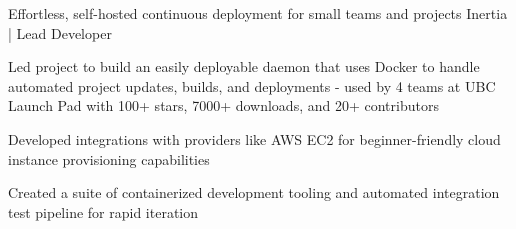  {\scshape{}}
\begin{cventries}

  \cventry
    {Effortless, self-hosted continuous deployment for small teams and projects} %
    {Inertia | Lead Developer} %
    {} %
    {} %
    {
      \begin{cvitems} %
        \item {Led project to build an easily deployable daemon that uses Docker to handle automated project updates, builds, and deployments - used by 4 teams at UBC Launch Pad with 100+ stars, 7000+ downloads, and 20+ contributors}
        \item {Developed integrations with providers like AWS EC2 for beginner-friendly cloud instance provisioning capabilities}
        \item{Created a suite of containerized development tooling and automated integration test pipeline for rapid iteration}
      \end{cvitems}
    }

\iffalse
  \cventry
    {Game scouting and performance analytics for League of Legends teams} %
    {Seer | Personal Project} %
    {\linktext{bobheadxi.dev/r/seer}} %
    {} %
    {
      \begin{cvitems} %
        \item {leveraged Google BigQuery as a data warehouse for team match history and queries for trends and aggregations}
        \item {built graph visualizations in Vue.js, Vuex, and ChartJS for displaying team trends and performance insights}
        \item {implemented a job-based framework for managing data to handle rate limits of dependencies and for error resilience}
      \end{cvitems}
    }
\fi
\iffalse
  \cventry
    {Continuous benchmarking and benchmark visualization} %
    {Gobenchdata | Personal Project} %
    {\linktext{bobheadxi.dev/r/gobenchdata}} %
    {} %
    {
      \begin{cvitems} %
        \item {built a command-line tool and GitHub action for automatically running Go benchmarks and parsing output into JSON}
        \item {created a web application that can visualize JSON data stored in GitHub pages to chart performance improvements}
      \end{cvitems}
    }
\fi


\end{cventries}
